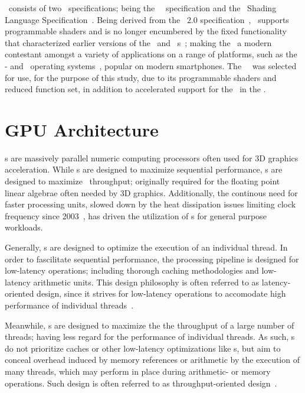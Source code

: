 \dvttermopenglestwopointo\ consists of two \dvttermkhronos\ specifications; being the \dvttermopenglestwopointo\ \dvttermapi\ specification and the \dvttermopengles\ Shading Language Specification~.
Being derived from the \dvttermopengl ~$2.0$ specification~, \dvttermopenglestwopointo\ supports programmable shaders and is no longer encumbered by the fixed functionality that characterized earlier versions of the \dvttermopengl\ and \dvttermopengles\ \dvttermapi s~; making the \dvttermapi\ a modern contestant amongst a variety of applications on a range of platforms, such as the \dvttermandroid - and \dvttermios\ operating systems~, popular on modern smartphones.
The \dvttermopenglestwopointo\ \dvttermapi\ was selected for use, for the purpose of this study, due to its programmable shaders and reduced function set, in addition to accelerated support for the \dvttermapi\ in the \dvttermandroidemulator .

\section{GPU Architecture}
\label{sec:backgroundandrelatedwork_gpuarchitecture}
\dvttermgpu s are massively parallel numeric computing processors often used for 3D graphics acceleration.
While \dvttermcpu s are designed to maximize sequential performance, \dvttermgpu s are designed to maximize \dvttermflops\ throughput; originally required for the floating point linear algebrae often needed by 3D graphics.
Additionally, the continous need for faster processing units, slowed down by the heat dissipation issues limiting clock frequency since 2003~, has driven the utilization of \dvttermgpu s for general purpose workloads.

Generally, \dvttermcpu s are designed to optimize the execution of an individual thread.
In order to fascilitate sequential performance, the processing pipeline is designed for low-latency operations; including thorough caching methodologies and low-latency arithmetic units.
This design philosophy is often referred to as latency-oriented design, since it strives for low-latency operations to accomodate high performance of individual threads~.

Meanwhile, \dvttermgpu s are designed to maximize the the throughput of a large number of threads; having less regard for the performance of individual threads.
As such, \dvttermgpu s do not prioritize caches or other low-latency optimizations like \dvttermcpu s, but aim to conceal overhead induced by memory references or arithmetic by the execution of many threads, which may perform in place during arithmetic- or memory operations.
Such design is often referred to as throughput-oriented design~.

